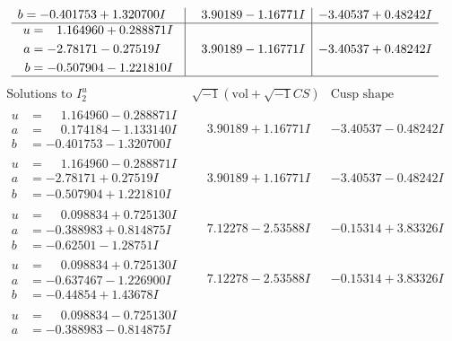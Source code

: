 \documentclass[1p]{elsarticle_modified}
\theoremstyle{definition}
\newcommand{\I}{\sqrt{-1}}
\begin{document}
$$\begin{array}{c|c|c}
\begin{aligned}
b &= -0.401753 + 1.320700 I\end{aligned}
 & \phantom{-}3.90189 - 1.16771 I & -3.40537 + 0.48242 I \\ \hline\begin{aligned}
u &= \phantom{-}1.164960 + 0.288871 I \\
a &= -2.78171 - 0.27519 I \\
b &= -0.507904 - 1.221810 I\end{aligned}
 & \phantom{-}3.90189 - 1.16771 I & -3.40537 + 0.48242 I\\
 \hline 
 \end{array}$$\newpage$$\begin{array}{c|c|c}  
\text{Solutions to }I^u_{2}& \I (\text{vol} + \sqrt{-1}CS) & \text{Cusp shape}\\
 \hline 
\begin{aligned}
u &= \phantom{-}1.164960 - 0.288871 I \\
a &= \phantom{-}0.174184 - 1.133140 I \\
b &= -0.401753 - 1.320700 I\end{aligned}
 & \phantom{-}3.90189 + 1.16771 I & -3.40537 - 0.48242 I \\ \hline\begin{aligned}
u &= \phantom{-}1.164960 - 0.288871 I \\
a &= -2.78171 + 0.27519 I \\
b &= -0.507904 + 1.221810 I\end{aligned}
 & \phantom{-}3.90189 + 1.16771 I & -3.40537 - 0.48242 I \\ \hline\begin{aligned}
u &= \phantom{-}0.098834 + 0.725130 I \\
a &= -0.388983 + 0.814875 I \\
b &= -0.62501 - 1.28751 I\end{aligned}
 & \phantom{-}7.12278 - 2.53588 I & -0.15314 + 3.83326 I \\ \hline\begin{aligned}
u &= \phantom{-}0.098834 + 0.725130 I \\
a &= -0.637467 - 1.226900 I \\
b &= -0.44854 + 1.43678 I\end{aligned}
 & \phantom{-}7.12278 - 2.53588 I & -0.15314 + 3.83326 I \\ \hline\begin{aligned}
u &= \phantom{-}0.098834 - 0.725130 I \\
a &= -0.388983 - 0.814875 I \\

\end{aligned}
\end{array}$$
\end{document}

